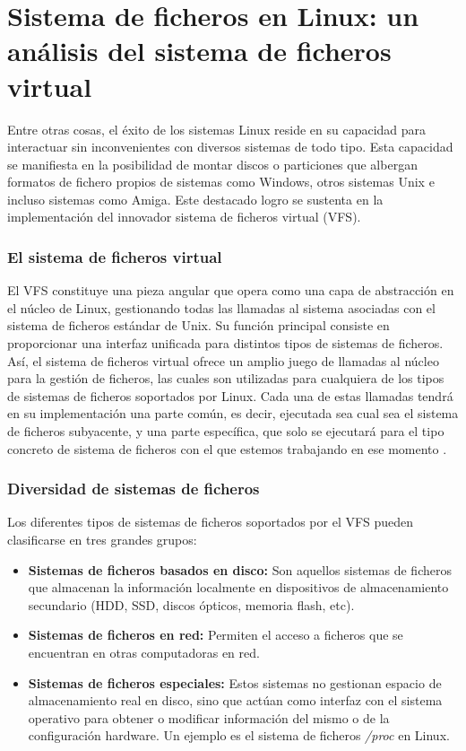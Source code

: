 \section{Sistema de ficheros en Linux: un análisis del sistema de ficheros virtual}

Entre otras cosas, el éxito de los sistemas Linux reside en su capacidad para interactuar sin inconvenientes con diversos sistemas de todo tipo. Esta capacidad se manifiesta en la posibilidad de montar discos o particiones que albergan formatos de fichero propios de sistemas como Windows, otros sistemas Unix e incluso sistemas como Amiga. Este destacado logro se sustenta en la implementación del innovador sistema de ficheros virtual (VFS). 

\subsubsection{El sistema de ficheros virtual}

El VFS constituye una pieza angular que opera como una capa de abstracción en el núcleo de Linux, gestionando todas las llamadas al sistema asociadas con el sistema de ficheros estándar de Unix. Su función principal consiste en proporcionar una interfaz unificada para distintos tipos de sistemas de ficheros.\\

Así, el sistema de ficheros virtual ofrece un amplio juego de llamadas al núcleo para la gestión de ficheros, las cuales son utilizadas para cualquiera de los tipos de sistemas de ficheros soportados por Linux. Cada una de estas llamadas tendrá en su implementación una parte común, es decir, ejecutada sea cual sea el sistema de ficheros subyacente, y una parte específica, que solo se ejecutará para el tipo concreto de sistema de ficheros con el que estemos trabajando en ese momento \cite{bovet2005,valero2006,bach1987}.

\subsubsection{Diversidad de sistemas de ficheros}

Los diferentes tipos de sistemas de ficheros soportados por el VFS pueden clasificarse en tres grandes grupos:

\begin{itemize}
    \item \textbf{Sistemas de ficheros basados en disco:} Son aquellos sistemas de ficheros que almacenan la información localmente en dispositivos de almacenamiento secundario (HDD, SSD, discos ópticos, memoria flash, etc).
    \item \textbf{Sistemas de ficheros en red:} Permiten el acceso a ficheros que se encuentran en otras computadoras en red. 
    \item \textbf{Sistemas de ficheros especiales:} Estos sistemas no gestionan espacio de almacenamiento real en disco, sino que actúan como interfaz con el sistema operativo para obtener o modificar información del mismo o de la configuración hardware. Un ejemplo es el sistema de ficheros \textit{/proc} en Linux.
\end{itemize}


